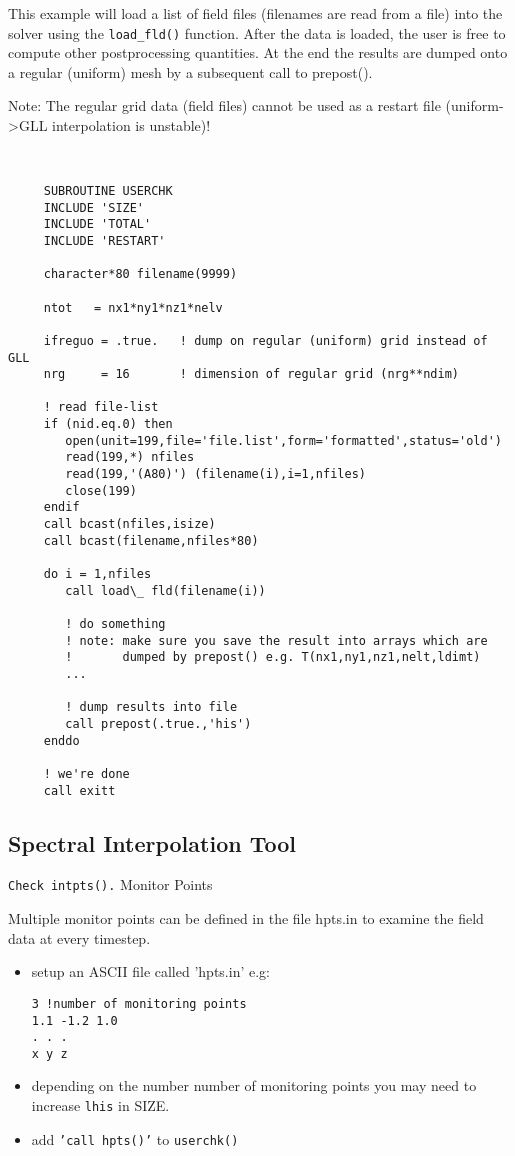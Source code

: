This example will load a list of field files (filenames are read from a file) into the solver using the {\tt load\_fld()} function. After the data is loaded, the user is free to compute other postprocessing quantities. At the end the results are dumped onto a regular (uniform) mesh by a subsequent call to prepost().

Note: The regular grid data (field files) cannot be used as a restart file (uniform->GLL interpolation is unstable)!

\begin{verbatim}


     SUBROUTINE USERCHK
     INCLUDE 'SIZE'
     INCLUDE 'TOTAL'
     INCLUDE 'RESTART' 

     character*80 filename(9999)

     ntot   = nx1*ny1*nz1*nelv

     ifreguo = .true.   ! dump on regular (uniform) grid instead of GLL
     nrg     = 16       ! dimension of regular grid (nrg**ndim)
 
     ! read file-list
     if (nid.eq.0) then
        open(unit=199,file='file.list',form='formatted',status='old')
        read(199,*) nfiles
        read(199,'(A80)') (filename(i),i=1,nfiles)
        close(199)
     endif
     call bcast(nfiles,isize)
     call bcast(filename,nfiles*80)       

     do i = 1,nfiles
        call load\_ fld(filename(i))

        ! do something
        ! note: make sure you save the result into arrays which are
        !       dumped by prepost() e.g. T(nx1,ny1,nz1,nelt,ldimt)
        ...

        ! dump results into file
        call prepost(.true.,'his')
     enddo

     ! we're done
     call exitt

\end{verbatim}

\subsection{Spectral Interpolation Tool}

{\tt Check intpts().}
Monitor Points

Multiple monitor points can be defined in the file hpts.in to examine the field data at every timestep.

\begin{itemize}
\item setup an ASCII file called 'hpts.in' e.g: 
\begin{verbatim}
3 !number of monitoring points
1.1 -1.2 1.0
. . .
x y z
\end{verbatim}

\item depending on the number number of monitoring points you may need to increase {\tt lhis} in SIZE.
\item    add {\tt 'call hpts()'} to {\tt userchk()} 
\end{itemize}

